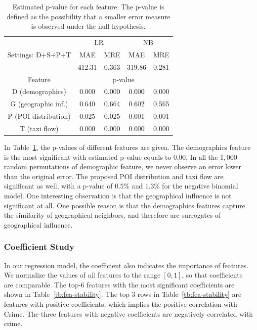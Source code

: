 \begin{table}[h]
\centering
\caption{Estimated p-value for each feature. The p-value is defined as the possibility that a smaller error measure is observed under the null hypothesis. }
\vspace{2mm}
\label{tb:permt}
\begin{tabular}{|c|c|c|c|c|}
\hline
\multirow{3}{*}{Settings: D+S+P+T} & \multicolumn{2}{c}{LR} & \multicolumn{2}{|c|}{NB} \\ \cline{2-5}
	& MAE & MRE & MAE & MRE \\ \cline{2-5}
	& 412.31 & 0.363 & 319.86& 0.281 \\ \hline
Feature & \multicolumn{4}{c|}{p-value} \\ \hline
D (demographics) & 0.000 & 0.000 & 0.000 & 0.000 \\ \hline 
G (geographic inf.) & 0.640 & 0.664 & 0.602 & 0.565	\\ \hline
P (POI distribution) & 0.025 & 0.025 & 0.001 & 0.001	\\ \hline
T (taxi flow) & 0.000 & 0.000 & 0.000 & 0.000 \\ \hline
\end{tabular}
\end{table}

In Table~\ref{tb:permt}, the p-values of different features are given.  The demographics feature is the most significant with estimated p-value equals to $0.00$. In all the $1,000$ random permutations of demographic feature, we never observe an error lower than the original error.  The proposed POI distribution and taxi flow are significant as well, with  a p-value of $0.5\%$ and $1.3\%$ for the negative binomial model.  One interesting observation is that the geographical influence is not significant at all. One possible reason is that the demographics features capture the similarity of geographical neighbors, and therefore are surrogates of geographical influence.





\subsubsection{Coefficient Study}

In our regression model, the coefficient also indicates the importance of features. We normalize the values of all features to the range $[0,1]$, so that coefficients are comparable. The top-6 features with the most significant coefficients are shown in Table~\ref{tb:fea-stability}. The top 3 rows in Table~\ref{tb:fea-stability} are features with positive coefficients, which implies the positive correlation with Crime. The three features with negative coefficients are negatively correlated with crime.

